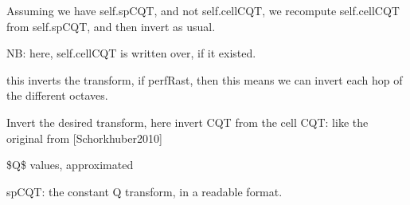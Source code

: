 \documentclass[letterpaper,10pt,english]{sphinxmanual}
\begin{document}
\begin{fulllineitems}

\begin{fulllineitems}
\label{reference/tftransforms:pyfasst.tftransforms.minqt.CQTransfo.invertFromSpCQT}
Assuming we have self.spCQT, and not self.cellCQT, we recompute
self.cellCQT from self.spCQT, and then invert as usual.

NB: here, self.cellCQT is written over, if it existed.

\end{fulllineitems}


\begin{fulllineitems}
\label{reference/tftransforms:pyfasst.tftransforms.minqt.CQTransfo.invertFromSpCQTRast}
this inverts the transform, if perfRast, then this means
we can invert each hop of the different octaves.

\end{fulllineitems}


\begin{fulllineitems}
\label{reference/tftransforms:pyfasst.tftransforms.minqt.CQTransfo.invertTransform}
Invert the desired transform, here invert CQT
from the cell CQT: like the original from {[}Schorkhuber2010{]}

\end{fulllineitems}


\begin{fulllineitems}
\label{reference/tftransforms:pyfasst.tftransforms.minqt.CQTransfo.qValues}
\$Q\$ values, approximated

\end{fulllineitems}


\begin{fulllineitems}
\label{reference/tftransforms:pyfasst.tftransforms.minqt.CQTransfo.spCQT}
spCQT: the constant Q transform, in a readable format.


\end{fulllineitems}
\end{fulllineitems}
\end{document}
